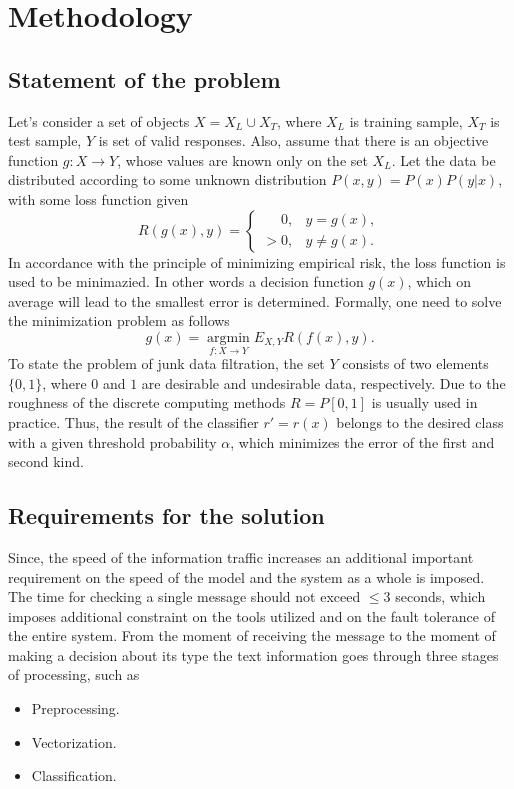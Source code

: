 \documentclass[12pt]{jpconf}
\begin{document}
\section{Methodology}
\subsection{Statement of the problem}
Let's consider a set of objects $ X = X_L \cup X_T$, where
$X_L$ is training sample,
$X_T$ is test sample,
$Y$ is set of valid responses. Also, assume that there is an objective function $g: X \rightarrow Y$, whose values are known only on the set $X_L$. Let the data be distributed according to some unknown distribution $P (x,y) = P(x) P (y|x)$, with some loss function given
$$
R(g(x), y) = 
\begin{cases} 
\phantom{>}0, & y = g(x), \\
> 0, & y \neq g(x).
\end{cases}
$$
In accordance with the principle of minimizing empirical risk, the loss function is used to be minimazied. In other words a decision function $g(x)$, which on average will lead to the smallest error is determined. Formally, one need to solve the minimization problem as follows
$$
g(x) = \operatorname*{argmin}_{f: X \rightarrow Y} E_{X,Y} R(f(x), y).
$$
To state the problem of junk data filtration, the set $Y$ consists of two elements $\{0, 1\}$, where $0$ and $1$ are desirable and undesirable data, respectively. Due to the roughness of the discrete computing methods $R = P[0, 1]$ is usually used in practice. Thus, the result of the classifier $r' = r(x)$ belongs to the desired class with a given threshold probability $\alpha$, which minimizes the error of the first and second kind.

\subsection{Requirements for the solution}
Since, the speed of the information traffic increases an additional important requirement on the speed of the model and the system as a whole is imposed. The time for checking a single message should not exceed $\leqslant3$ seconds, which imposes additional constraint on the tools utilized and on the fault tolerance of the entire system.
From the moment of receiving the message to the moment of making a decision about its type the text information goes through three stages of processing, such as
\begin{itemize}
\item Preprocessing.
\item Vectorization.
\item Classification.
\end{itemize}
\end{document}
